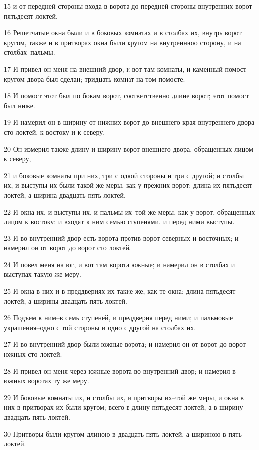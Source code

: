 \par 15 и от передней стороны входа в ворота до передней стороны внутренних ворот пятьдесят локтей.
\par 16 Решетчатые окна были и в боковых комнатах и в столбах их, внутрь ворот кругом, также и в притворах окна были кругом на внутреннюю сторону, и на столбах--пальмы.
\par 17 И привел он меня на внешний двор, и вот там комнаты, и каменный помост кругом двора был сделан; тридцать комнат на том помосте.
\par 18 И помост этот был по бокам ворот, соответственно длине ворот; этот помост был ниже.
\par 19 И намерил он в ширину от нижних ворот до внешнего края внутреннего двора сто локтей, к востоку и к северу.
\par 20 Он измерил также длину и ширину ворот внешнего двора, обращенных лицом к северу,
\par 21 и боковые комнаты при них, три с одной стороны и три с другой; и столбы их, и выступы их были такой же меры, как у прежних ворот: длина их пятьдесят локтей, а ширина двадцать пять локтей.
\par 22 И окна их, и выступы их, и пальмы их--той же меры, как у ворот, обращенных лицом к востоку; и входят к ним семью ступенями, и перед ними выступы.
\par 23 И во внутренний двор есть ворота против ворот северных и восточных; и намерил он от ворот до ворот сто локтей.
\par 24 И повел меня на юг, и вот там ворота южные; и намерил он в столбах и выступах такую же меру.
\par 25 И окна в них и в преддвериях их такие же, как те окна: длина пятьдесят локтей, а ширины двадцать пять локтей.
\par 26 Подъем к ним--в семь ступеней, и преддверия перед ними; и пальмовые украшения--одно с той стороны и одно с другой на столбах их.
\par 27 И во внутренний двор были южные ворота; и намерил он от ворот до ворот южных сто локтей.
\par 28 И привел он меня через южные ворота во внутренний двор; и намерил в южных воротах ту же меру.
\par 29 И боковые комнаты их, и столбы их, и притворы их--той же меры, и окна в них в притворах их были кругом; всего в длину пятьдесят локтей, а в ширину двадцать пять локтей.
\par 30 Притворы были кругом длиною в двадцать пять локтей, а шириною в пять локтей.
